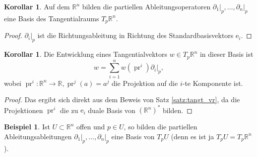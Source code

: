 \documentclass[a4paper]{scrreprt}
\numberwithin{equation}{chapter}
\newcommand{\e}{\mathrm{e}}
\DeclareMathOperator{\pr}{pr}
\theoremstyle{definition}
\newtheorem{kor}[defn]{Korollar}
\newtheorem{bsp}[defn]{Beispiel}
\begin{document}
\begin{kor}
	Auf dem $\mathbb R^n$ bilden die partiellen Ableitungsoperatoren $\left.\partial_1\right|_p, \dots, \left.\partial_n\right|_p$ eine Basis des Tangentialraums $T_p\mathbb R^n$.

	\begin{proof}
		$\left.\partial_i\right|_p$ ist die Richtungsableitung in Richtung des Standardbasisvektors $\e_i$.
	\end{proof}
\end{kor}

\begin{kor} \label{kor:entw_tangt_Rn}
	Die Entwicklung eines Tangentialvektors $w \in T_p\mathbb R^n$ in dieser Basis ist
	\[w = \sum_{i=1}^n w(\pr^i) \left.\partial_i\right|_p,\]
	wobei $\pr^i\colon \mathbb R^n \to \mathbb R, \pr^j(a) = a^j$ die Projektion auf die $i$-te Komponente ist.

	\begin{proof}
		Das ergibt sich direkt aus dem Beweis von Satz \ref{satz:tangt_vr}, da die Projektionen $\pr^i$ die zu $\e_i$ duale Basis von $(\mathbb R^n)^*$ bilden.
	\end{proof}
\end{kor}

\begin{bsp}
	Ist $U\subset\mathbb R^n$ offen und $p\in U$, so bilden die partiellen Ableitungsableitungen $\left.\partial_1\right|_p, \dots, \left.\partial_n\right|_p$ eine Basis von $T_pU$ (denn es ist ja $T_pU = T_p\mathbb R^n$).
\end{bsp}
\end{document}

